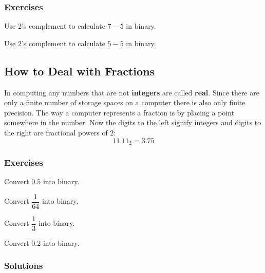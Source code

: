 \documentclass[11pt,a4paper]{report}
\newcommand{\bfb}[1]{{\bf \color{blue} #1}}
\begin{document}
\subsubsection{Exercises}

\begin{ex}
Use 2's complement to calculate $7-5$ in binary.
\end{ex}

\begin{ex}
Use 2's complement to calculate $5-5$ in binary.
\end{ex}



\subsection{How to Deal with Fractions}
In computing any numbers that are not \bfb{integers} are called \bfb{real}. Since there are only a finite number of storage spaces on a computer there is also only finite precision. The way a computer represents a fraction is by placing a point somewhere in the number. Now the digits to the left signify integers and digits to the right are fractional powers of $2$:
\[
11.11_2 = 3.75
\]


\subsubsection{Exercises}
\begin{ex}
Convert $0.5$ into binary.
\end{ex}


\begin{ex}
Convert $\dfrac{1}{64}$ into binary.
\end{ex}


\begin{ex}
Convert $\dfrac{1}{3}$ into binary.
\end{ex}


\begin{ex}
Convert $0.2$ into binary.
\end{ex}


\subsubsection{Solutions}
\printcursols
\end{document}
